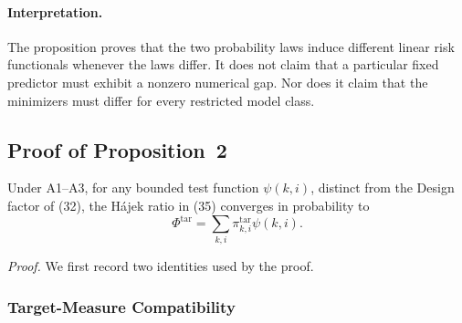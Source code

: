 \paragraph{Interpretation.}
The proposition proves that the two probability laws induce different linear
risk functionals whenever the laws differ.  It does not claim that a particular
fixed predictor must exhibit a nonzero numerical gap.  Nor does it claim that
the minimizers must differ for every restricted model class.


\subsection{Proof of Proposition~2}
\label{app:proof_prop2}

\begin{proposition*}
Under A1--A3, for any bounded test function $\psi(k,i)$, distinct from
the Design factor of (32), the H\'ajek ratio in
(35) converges in probability to
\begin{equation}
    \Phi^{\mathrm{tar}}
    =
    \sum_{k,i}
    \pi^{\mathrm{tar}}_{k,i}\psi(k,i).
    \label{eq:app_target_phi}
\end{equation}
\end{proposition*}

\noindent\emph{Proof.}
We first record two identities used by the proof.

\subsubsection{Target-Measure Compatibility}

